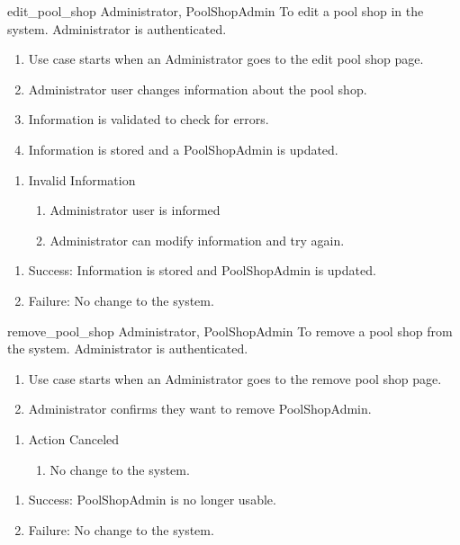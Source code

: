 \usecase
{edit\_pool\_shop}
{Administrator, PoolShopAdmin}
{To edit a pool shop in the system.}
{Administrator is authenticated.}
{
\begin{enumerate}
\item Use case starts when an Administrator goes to the edit pool shop page.
\item Administrator user changes information about the pool shop.
\item Information is validated to check for errors.
\item Information is stored and a PoolShopAdmin is updated.
\end{enumerate}
}
{
\begin{enumerate}
\item Invalid Information
\begin{enumerate}
\item Administrator user is informed
\item Administrator can modify information and try again.
\end{enumerate}
\end{enumerate}
}
{
\begin{enumerate}
\item Success: Information is stored and PoolShopAdmin is updated.
\item Failure: No change to the system.
\end{enumerate}
}

\usecase
{remove\_pool\_shop}
{Administrator, PoolShopAdmin}
{To remove a pool shop from the system.}
{Administrator is authenticated.}
{
\begin{enumerate}
\item Use case starts when an Administrator goes to the remove pool shop page.
\item Administrator confirms they want to remove PoolShopAdmin.
\end{enumerate}
}
{
\begin{enumerate}
\item Action Canceled
\begin{enumerate}
\item No change to the system.
\end{enumerate}
\end{enumerate}
}
{
\begin{enumerate}
\item Success: PoolShopAdmin is no longer usable.
\item Failure: No change to the system.
\end{enumerate}
}

